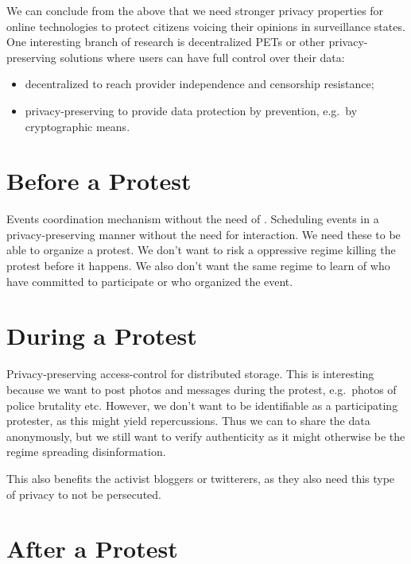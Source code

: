 \documentclass[a4paper]{llncs}
\begin{document}
We can conclude from the above that we need stronger privacy properties for 
online technologies to protect citizens voicing their opinions in surveillance 
states.
One interesting branch of research is decentralized \acp{PET} or other 
privacy-preserving solutions where users can have full control over their data:
\begin{itemize}
  \item decentralized to reach provider independence and censorship resistance;
  \item privacy-preserving to provide data protection by prevention, e.g.\ by 
    cryptographic means.
\end{itemize}


\section{Before a Protest}

Events coordination mechanism without the need of .
Scheduling events in a privacy-preserving manner without the need for 
interaction.
We need these to be able to organize a protest.
We don't want to risk a oppressive regime killing the protest before it 
happens.
We also don't want the same regime to learn of who have committed to 
participate or who organized the event.


\section{During a Protest}

Privacy-preserving access-control for distributed storage.
This is interesting because we want to post photos and messages during the 
protest, e.g.\ photos of police brutality etc.
However, we don't want to be identifiable as a participating protester, as this 
might yield repercussions.
Thus we can to share the data anonymously, but we still want to verify 
authenticity as it might otherwise be the regime spreading disinformation.

This also benefits the activist bloggers or twitterers, as they also need this 
type of privacy to not be persecuted.


\section{After a Protest}
\end{document}
